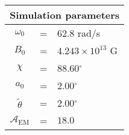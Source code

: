  \begin{tabular}{ccl}
\multicolumn{3}{c}{Simulation parameters} \\
\hline
$\omega_0$  &=& 62.8 rad/s\\
$B_0$  &=& $ 4.243\times 10^{13} $ G \\
$\chi$  &=& 88.60$^{\circ}$ \\
$a_0$ &=& 2.00$^{\circ}$ \\
$\tilde{\theta}$ &= & 2.00$^{\circ}$ \\
$\mathcal{A}_{\mathrm{EM}}$ &= & $18.0$
\end{tabular}
    